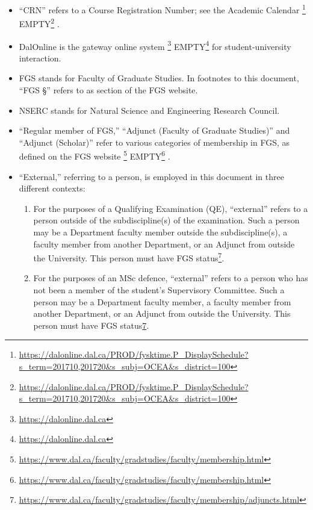 \documentclass[12pt]{article}
\newcommand{\furl}[2][EMPTY]%
    {\ifthenelse%
        {\equal{#1}{EMPTY}}%
        {\footnote{\footnotesize{\url{#2}}}}%
        {#1\footnote{\footnotesize{\url{#2}}}}%
    }
\newcommand{\supcom}{Supervisory Committee\xspace}
\newcommand{\FGS}{FGS\xspace}
\newcommand{\NSERC}{NSERC\xspace}
\newcommand{\dalonline}{DalOnline\xspace}
\begin{document}
\begin{itemize}

    \item ``CRN'' refers to a Course Registration Number; see the Academic
        Calendar\furl{https://dalonline.dal.ca/PROD/fysktime.P_DisplaySchedule?s_term=201710,201720&s_subj=OCEA&s_district=100}.

    \item \dalonline is the gateway online
        system\furl{https://dalonline.dal.ca} for student-university
        interaction.

    \item \FGS stands for Faculty of Graduate Studies. In footnotes to this
        document, ``FGS \S'' refers to as section of the FGS website.

    \item \NSERC stands for Natural Science and Engineering Research Council.

    \item ``Regular member of FGS,'' ``Adjunct (Faculty of Graduate Studies)''
        and ``Adjunct (Scholar)'' refer to various categories of membership in
        FGS, as defined on the FGS
        website\furl{https://www.dal.ca/faculty/gradstudies/faculty/membership.html}.

    \item ``External,'' referring to a person, is employed in this document in
        three different contexts:
        \begin{enumerate}

            \item For the purposes of a Qualifying Examination (QE),
                ``external'' refers to a person outside of the subdiscipline(s)
                of the examination.  Such a person may be a Department faculty
                member outside the subdiscipline(s), a faculty member from
                another Department, or an Adjunct from outside the University.
                This person must have FGS status\footnote{\label{footnote:adjunct}\footnotesize{\url{https://www.dal.ca/faculty/gradstudies/faculty/membership/adjuncts.html}}}.

            \item For the purposes of an MSc defence, ``external'' refers to a
                person who has not been a member of the student's \supcom.
                Such a person may be a Department faculty member, a faculty
                member from another Department, or an Adjunct from outside the
                University.  This person must have FGS
                status\cref{footnote:adjunct}.


\end{enumerate}
\end{itemize}
\end{document}

